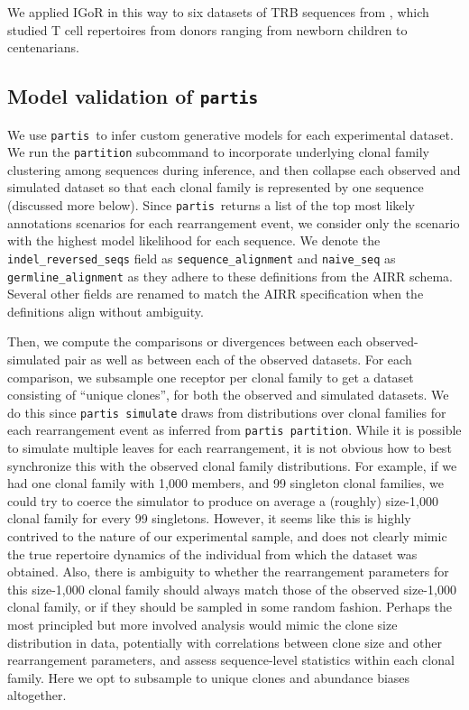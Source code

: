 \documentclass{article}
\newcommand{\partis}{\texttt{partis}}
\begin{document}
We applied IGoR in this way to six datasets of TRB sequences from \cite{Britanova2016-iw}, which studied T cell repertoires from donors ranging from newborn children to centenarians.

\subsection*{Model validation of \partis}

We use \partis\ to infer custom generative models for each experimental dataset.
We run the \texttt{partition} subcommand to incorporate underlying clonal family clustering among sequences during inference, and then collapse each observed and simulated dataset so that each clonal family is represented by one sequence (discussed more below).
Since \partis\ returns a list of the top most likely annotations scenarios for each rearrangement event, we consider only the scenario with the highest model likelihood for each sequence.
We denote the \texttt{indel\_reversed\_seqs} field as \texttt{sequence\_alignment} and \texttt{naive\_seq} as \texttt{germline\_alignment} as they adhere to these definitions from the AIRR schema.
Several other fields are renamed to match the AIRR specification when the definitions align without ambiguity.

Then, we compute the comparisons or divergences between each observed-simulated pair as well as between each of the observed datasets.
For each comparison, we subsample one receptor per clonal family to get a dataset consisting of ``unique clones'', for both the observed and simulated datasets.
We do this since \texttt{partis simulate} draws from distributions over clonal families for each rearrangement event as inferred from \texttt{partis partition}.
While it is possible to simulate multiple leaves for each rearrangement, it is not obvious how to best synchronize this with the observed clonal family distributions.
For example, if we had one clonal family with 1,000 members, and 99 singleton clonal families, we could try to coerce the simulator to produce on average a (roughly) size-1,000 clonal family for every 99 singletons.
However, it seems like this is highly contrived to the nature of our experimental sample, and does not clearly mimic the true repertoire dynamics of the individual from which the dataset was obtained.
Also, there is ambiguity to whether the rearrangement parameters for this size-1,000 clonal family should always match those of the observed size-1,000 clonal family, or if they should be sampled in some random fashion.
Perhaps the most principled but more involved analysis would mimic the clone size distribution in data, potentially with correlations between clone size and other rearrangement parameters, and assess sequence-level statistics within each clonal family.
Here we opt to subsample to unique clones and abundance biases altogether.
\end{document}
